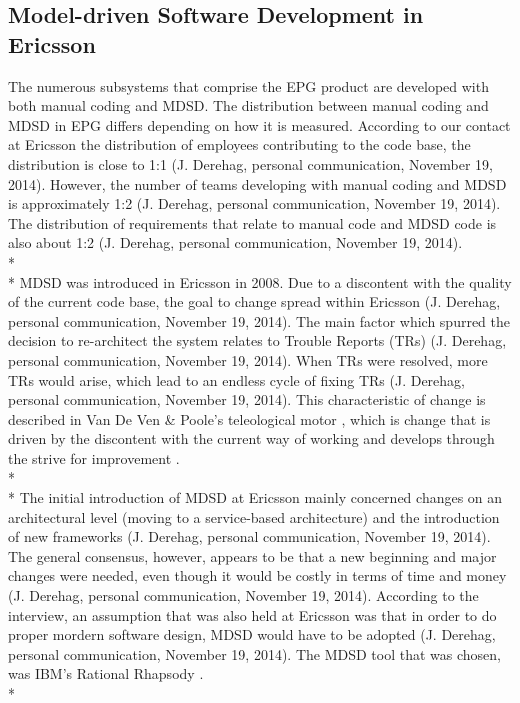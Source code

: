 \documentclass[final_report_innit.tex]{subfiles}
\begin{document}
\subsection{Model-driven Software Development in Ericsson}
The numerous subsystems that comprise the EPG product are developed with both manual coding and MDSD. The distribution between manual coding and MDSD in EPG differs depending on how it is measured. According to our contact at Ericsson the distribution of employees contributing to the code base, the distribution is close to 1:1 (J. Derehag, personal communication, November 19, 2014). However, the number of teams developing with manual coding and MDSD is approximately 1:2 (J. Derehag, personal communication, November 19, 2014). The distribution of requirements that relate to manual code and MDSD code is also about 1:2 (J. Derehag, personal communication, November 19, 2014).
\\* 
\\* 
MDSD was introduced in Ericsson in 2008. Due to a discontent with the quality of the current code base, the goal to change spread within Ericsson (J. Derehag, personal communication, November 19, 2014). The main factor which spurred the decision to re-architect the system relates to Trouble Reports (TRs) (J. Derehag, personal communication, November 19, 2014). When TRs were resolved, more TRs would arise, which lead to an endless cycle of fixing TRs (J. Derehag, personal communication, November 19, 2014). This characteristic of change is described in Van De Ven \& Poole’s teleological motor \cite{van1995explaining}, which is change that is driven by the discontent with the current way of working and develops through the strive for improvement \cite{van1995explaining}. 
\\* 
\\* 
The initial introduction of MDSD at Ericsson mainly concerned changes on an architectural level (moving to a service-based architecture) and the introduction of new frameworks (J. Derehag, personal communication, November 19, 2014). The general consensus, however, appears to be that a new beginning and major changes were needed, even though it would be costly in terms of time and money (J. Derehag, personal communication, November 19, 2014). According to the interview, an assumption that was also held at Ericsson was that in order to do proper mordern software design, MDSD would have to be adopted (J. Derehag, personal communication, November 19, 2014). The MDSD tool that was chosen, was IBM’s Rational Rhapsody \cite{rrf}.
\\* 
\end{document}
